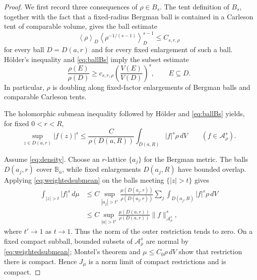 \documentclass[11pt]{article}
\newcommand{\B}{\mathbb B_n}
\newcommand{\A}{\mathcal A}
\newcommand{\dd}{\,dV}
\begin{document}
\begin{proof}
We first record three consequences of $\rho\in B_s$.  The tent definition
of $B_s$, together with the fact that a fixed-radius Bergman ball is
contained in a Carleson tent of comparable volume, gives the ball estimate
\begin{equation}\label{eq:ballBs}
 \left\langle\rho\right\rangle_D
 \left\langle\rho^{-1/(s-1)}\right\rangle_D^{s-1}
 \le C_{s,r,\rho}
\end{equation}
for every ball $D=D(a,r)$ and for every fixed enlargement of such a ball.
H\"older's inequality and \eqref{eq:ballBs} imply the subset estimate
\begin{equation}\label{eq:subset}
 \frac{\rho(E)}{\rho(D)}
 \ge c_{s,r,\rho}\left(\frac{V(E)}{V(D)}\right)^s,
 \qquad E\subseteq D.
\end{equation}
In particular, $\rho$ is doubling along fixed-factor enlargements of
Bergman balls and comparable Carleson tents.

The holomorphic submean inequality followed by H\"older and
\eqref{eq:ballBs} yields, for fixed $0<r<R$,
\begin{equation}\label{eq:weightedsubmean}
 \sup_{z\in D(a,r)}|f(z)|^s
 \le \frac{C}{\rho(D(a,R))}
        \int_{D(a,R)}|f|^s\rho\dd
 \qquad(f\in\A^s_\rho).
\end{equation}

Assume \eqref{eq:density}.  Choose an $r$-lattice
$\{a_j\}$ for the Bergman metric.  The balls $D(a_j,r)$ cover $\B$, while
fixed enlargements $D(a_j,R)$ have bounded overlap.  Applying
\eqref{eq:weightedsubmean} on the balls meeting $\{|z|>t\}$ gives
\begin{align}\label{eq:tail}
 \int_{|z|>t}|f|^s\,d\mu
 &\le C
 \sup_{|a_j|>t'}
 \frac{\mu(D(a_j,r))}{\rho(D(a_j,r))}
 \sum_j\int_{D(a_j,R)}|f|^s\rho\dd \\
 &\le C
 \sup_{|a|>t'}
 \frac{\mu(D(a,r))}{\rho(D(a,r))}
 \|f\|_{\A^s_\rho}^s,
\end{align}
where $t'\to1$ as $t\to1$.  Thus the norm of the outer restriction tends
to zero.  On a fixed compact subball, bounded subsets of $\A^s_\rho$ are
normal by \eqref{eq:weightedsubmean}; Montel's theorem and
$\mu\le C_0\rho\,dV$ show that restriction there is compact.  Hence
$J_\mu$ is a norm limit of compact restrictions and is compact.


\end{proof}
\end{document}
